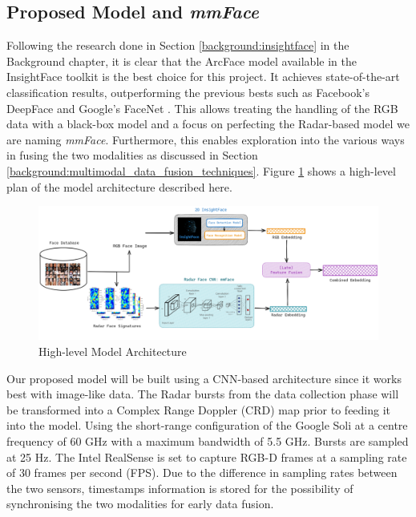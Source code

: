 \documentclass{interim}
\begin{document}
\subsection{Proposed Model and \textit{mmFace}}
Following the research done in Section \ref{background:insightface} in the Background chapter, it is clear that the ArcFace model available in the InsightFace toolkit is the best choice for this project. It achieves state-of-the-art classification results, outperforming the previous bests such as Facebook's DeepFace \cite{taigman2014deepface} and Google's FaceNet \cite{schroff2015facenet}. This allows treating the handling of the RGB data with a black-box model and a focus on perfecting the Radar-based model we are naming \textit{mmFace}. Furthermore, this enables exploration into the various ways in fusing the two modalities as discussed in Section \ref{background:multimodal_data_fusion_techniques}. Figure \ref{fig:model_architecture} shows a high-level plan of the model architecture described here.

\begin{figure}[h!]
    \centering
    \includegraphics[width=1\textwidth]{images/model_architecture.png}
    \caption{High-level Model Architecture}
    \label{fig:model_architecture}
\end{figure}

Our proposed model will be built using a CNN-based architecture since it works best with image-like data. The Radar bursts from the data collection phase will be transformed into a Complex Range Doppler (CRD) map \cite{lien2016soli, hayashi2021radarnet} prior to feeding it into the model. Using the short-range configuration of the Google Soli at a centre frequency of 60 GHz with a maximum bandwidth of 5.5 GHz. Bursts are sampled at 25 Hz. The Intel RealSense is set to capture RGB-D frames at a sampling rate of 30 frames per second (FPS). Due to the difference in sampling rates between the two sensors, timestamps information is stored for the possibility of synchronising the two modalities for early data fusion.
\end{document}
